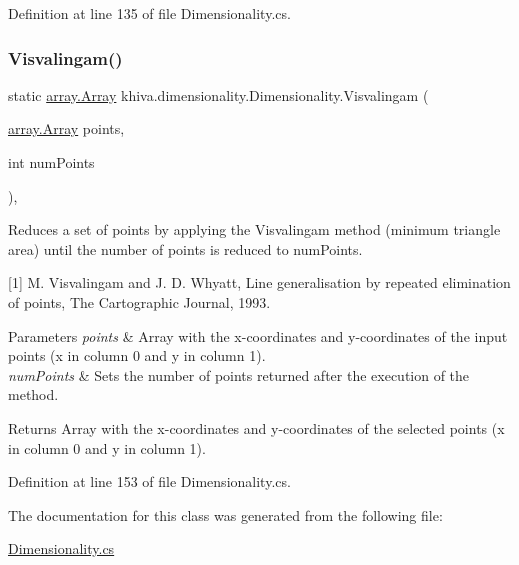 Definition at line 135 of file Dimensionality.\+cs.

\mbox{\label{classkhiva_1_1dimensionality_1_1_dimensionality_ae2b4c8288f9537bce116837abe7e0539}} 
\subsubsection{\texorpdfstring{Visvalingam()}{Visvalingam()}}
{\footnotesize\ttfamily static \mbox{\hyperlink{classkhiva_1_1array_1_1_array}{array.\+Array}} khiva.\+dimensionality.\+Dimensionality.\+Visvalingam (\begin{DoxyParamCaption}\item[{\mbox{\hyperlink{classkhiva_1_1array_1_1_array}{array.\+Array}}}]{points,  }\item[{int}]{num\+Points }\end{DoxyParamCaption})\hspace{0.3cm}{\ttfamily [inline]}, {\ttfamily [static]}}



Reduces a set of points by applying the Visvalingam method (minimum triangle area) until the number of points is reduced to num\+Points. 

\mbox{[}1\mbox{]} M. Visvalingam and J. D. Whyatt, Line generalisation by repeated elimination of points, The Cartographic Journal, 1993. 


\begin{DoxyParams}{Parameters}
{\em points} & Array with the x-\/coordinates and y-\/coordinates of the input points (x in column 0 and y in column 1).\\
\hline
{\em num\+Points} & Sets the number of points returned after the execution of the method.\\
\hline
\end{DoxyParams}
\begin{DoxyReturn}{Returns}
Array with the x-\/coordinates and y-\/coordinates of the selected points (x in column 0 and y in column 1).
\end{DoxyReturn}


Definition at line 153 of file Dimensionality.\+cs.



The documentation for this class was generated from the following file\+:\begin{DoxyCompactItemize}
\item 
\mbox{\hyperlink{_dimensionality_8cs}{Dimensionality.\+cs}}\end{DoxyCompactItemize}
